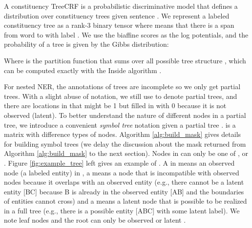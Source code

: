 A constituency TreeCRF is a probabilistic discriminative model that defines a distribution over constituency trees  given  sentence . 
We represent a labeled constituency tree as a rank-3 binary tensor  where  means that there is a span from word  to  with label . 
We use the biaffine scores  as the log potentials, and the probability of a tree is given by the Gibbs distribution: 


Where  is the partition function that sums over all possible tree structure , which can be computed exactly with the Inside algorithm \citep{Eisner2016InsideOutsideAF}.  


For nested NER, the annotations of trees are incomplete so we only get partial trees. 
With a slight abuse of notation, we still use  to denote partial trees,
and there are locations in  that might be 1 but filled in with 0 because it is not observed (latent). 
To better understand the nature of different nodes in a partial tree, 
we introduce a convenient \textit{symbol tree}  notation  given a partial tree . 
 is a  matrix with difference types of nodes.
Algorithm \ref{alg:build_mask} gives details for building symbol trees  (we delay the discussion about the mask  returned from Algorithm \ref{alg:build_mask} to the next section).
Nodes in  can only be one of , \scalebox{0.8}{} or . 
Figure \ref{fig:example_tree} left gives an example of . 
A  in  means an observed node (a labeled entity) in , 
a  means a node that is incompatible with observed nodes because it overlaps with an observed entity 
(e.g., there cannot be a latent entity [BC] because B is already in the observed entity [AB] and the boundaries of entities cannot cross)
and 
a \scalebox{0.8}{} means a latent node that is possible to be realized in a full tree (e.g., there is a possible entity [ABC] with some latent label). 
We note leaf nodes and the root can only be observed  or latent \scalebox{0.8}{}. 

